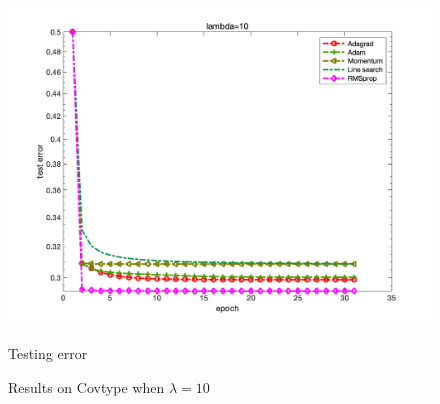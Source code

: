 \documentclass{article}
\begin{document}
\begin{figure}[H]
\begin{minipage}{0.33\linewidth}
		\includegraphics[width=1\linewidth]{./fig/err_c1}
		\caption{Testing error}
	\end{minipage}
	\caption*{Results on Covtype when $\lambda=10$}
\end{figure}
\end{document}
